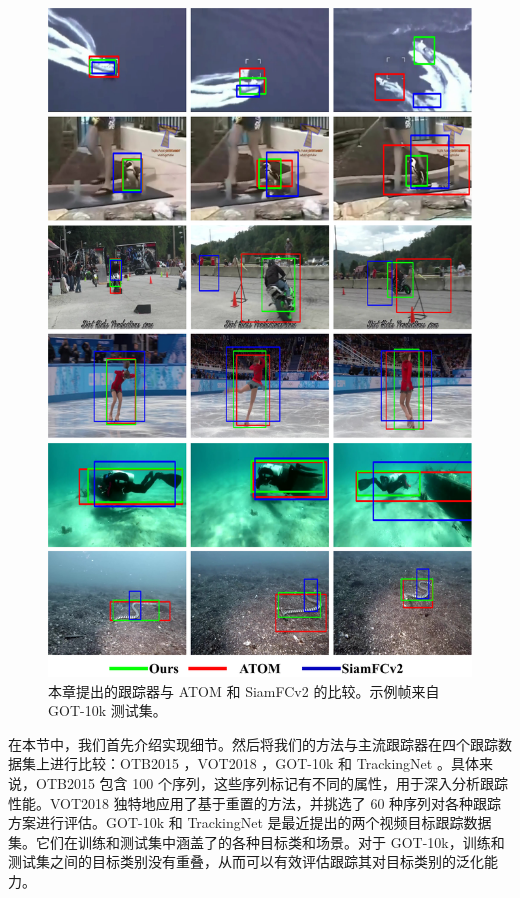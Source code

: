 \begin{figure}[t]
    \centering
    \includegraphics[width=1.0\textwidth]{Img/MTP/got10k/visulization.pdf}
    \caption{本章提出的跟踪器与 ATOM \cite{danelljan2019atom} 和 SiamFCv2 \cite{SiamFC} 的比较。示例帧来自 GOT-10k \cite{GOT-10k} 测试集。}
    \label{fig:vis}
\end{figure}

在本节中，我们首先介绍实现细节。然后将我们的方法与主流跟踪器在四个跟踪数据集上进行比较：OTB2015 \cite{OTB}，VOT2018 \cite{kristan2018sixth}，GOT-10k \cite{GOT-10k} 和 TrackingNet \cite{muller2018trackingnet}。具体来说，OTB2015 \cite{OTB} 包含 100 个序列，这些序列标记有不同的属性，用于深入分析跟踪性能。VOT2018 \cite{kristan2018sixth} 独特地应用了基于重置的方法，并挑选了 60 种序列对各种跟踪方案进行评估。GOT-10k \cite{GOT-10k} 和 TrackingNet \cite{muller2018trackingnet} 是最近提出的两个视频目标跟踪数据集。它们在训练和测试集中涵盖了的各种目标类和场景。对于 GOT-10k，训练和测试集之间的目标类别没有重叠，从而可以有效评估跟踪其对目标类别的泛化能力。

